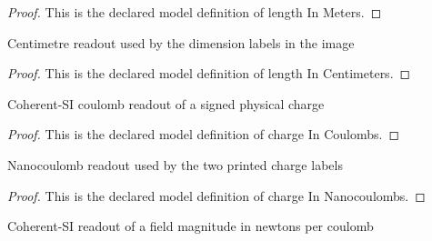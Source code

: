 \begin{proof}
  This is the declared model definition of length In Meters.
\end{proof}
\begin{definition}
  \label{def:physics:phyx-mini-0913:phyxminiproblems-problemphyxmini0913-lengthincentimeters}
  Centimetre readout used by the dimension labels in the image
\end{definition}
\begin{proof}
  This is the declared model definition of length In Centimeters.
\end{proof}
\begin{definition}
  \label{def:physics:phyx-mini-0913:phyxminiproblems-problemphyxmini0913-chargeincoulombs}
  Coherent-SI coulomb readout of a signed physical charge
\end{definition}
\begin{proof}
  This is the declared model definition of charge In Coulombs.
\end{proof}
\begin{definition}
  \label{def:physics:phyx-mini-0913:phyxminiproblems-problemphyxmini0913-chargeinnanocoulombs}
  Nanocoulomb readout used by the two printed charge labels
\end{definition}
\begin{proof}
  This is the declared model definition of charge In Nanocoulombs.
\end{proof}
\begin{definition}
  \label{def:physics:phyx-mini-0913:phyxminiproblems-problemphyxmini0913-fieldmagnitudeinnewtonspercoulomb}
  Coherent-SI readout of a field magnitude in newtons per coulomb
\end{definition}
